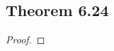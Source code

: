 \documentclass[../../main.tex]{subfiles}
\begin{document}
\subsection{Theorem 6.24}
\begin{wts}

\end{wts}
\begin{proof}

\end{proof}
\end{document}
